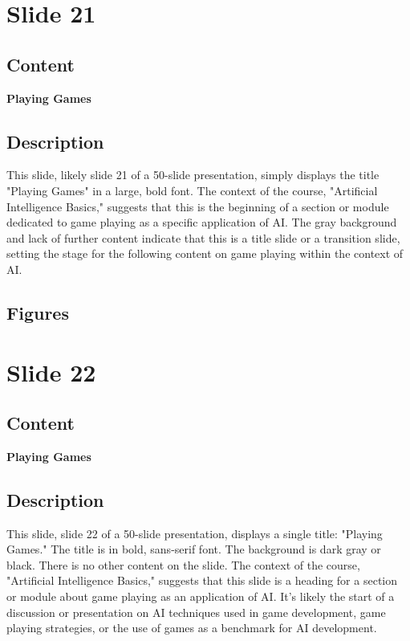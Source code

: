 \documentclass{article}%
\begin{document}
%
\newpage%
\section{Slide 21}%
\label{sec:Slide21}%
\subsection{Content}%

\textbf{Playing Games}
%
\subsection{Description}%
This slide, likely slide 21 of a 50-slide presentation, simply displays the title "Playing Games" in a large, bold font.  The context of the course, "Artificial Intelligence Basics," suggests that this is the beginning of a section or module dedicated to game playing as a specific application of AI.  The gray background and lack of further content indicate that this is a title slide or a transition slide, setting the stage for the following content on game playing within the context of AI.%
\subsection{Figures}%
\begin{figure}[H]%
\centering%
\end{figure}

%
\newpage%
\section{Slide 22}%
\label{sec:Slide22}%
\subsection{Content}%

\textbf{Playing Games}
%
\subsection{Description}%
This slide, slide 22 of a 50-slide presentation, displays a single title: "Playing Games."  The title is in bold, sans-serif font.  The background is dark gray or black.  There is no other content on the slide.  The context of the course, "Artificial Intelligence Basics," suggests that this slide is a heading for a section or module about game playing as an application of AI.  It's likely the start of a discussion or presentation on AI techniques used in game development, game playing strategies, or the use of games as a benchmark for AI development.%
\end{document}
